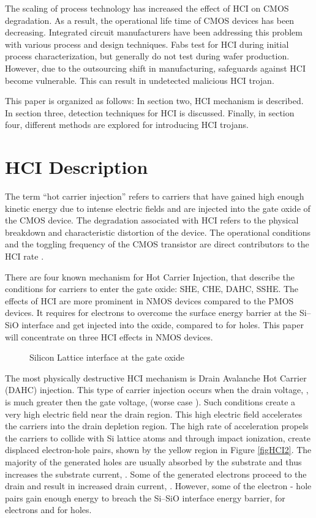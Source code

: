 \documentclass[12pt,conference]{IEEEtran}
\begin{document}
The scaling of process technology has increased the effect of HCI on CMOS degradation.
As a result, the operational life time of CMOS devices has been 
decreasing.
Integrated circuit manufacturers have been addressing this problem
with various process and design techniques.
Fabs test for HCI during initial process characterization, but
generally do not test during wafer production.
However, due to the outsourcing shift in
manufacturing, safeguards against HCI become vulnerable.  This can 
result in undetected malicious HCI trojan.  

This paper is organized as follows:
In section two, HCI mechanism is described.
In section three, detection techniques for HCI is discussed.
Finally, in section four, different methods are explored for introducing HCI trojans.


\section*{HCI Description}

The term ``hot carrier injection'' refers to carriers
that have gained high enough kinetic energy due to intense electric
fields and are injected into the gate oxide of the CMOS device.
The degradation associated with HCI refers to the
physical breakdown and characteristic distortion of the device.
The operational conditions and the toggling frequency of
the CMOS transistor are direct contributors to the HCI rate \cite{HCI96A}.

There are four known mechanism for Hot Carrier Injection,
that describe the conditions for carriers to enter the gate oxide: SHE, CHE, DAHC, SSHE. 
The effects of HCI are more prominent in NMOS devices compared
to the PMOS devices.  It requires  for electrons to
overcome the surface energy barrier at the Si--SiO interface
and get injected into the oxide, compared to  for holes.
This paper will concentrate on three HCI effects in NMOS devices. 
\begin{figure}[htp]
\caption{Silicon Lattice interface at the gate oxide}
\label{figHCI1}
\end{figure}


The most physically destructive HCI mechanism is Drain Avalanche
Hot Carrier (DAHC) injection.
This type of carrier injection occurs when the drain voltage,
, is much greater then the gate voltage,  (worse case  ).
Such conditions create a very high electric field near the drain region.
This high electric field accelerates the carriers
into the drain depletion region.
The high rate of acceleration propels the carriers to collide
with Si lattice atoms and through impact ionization,
create displaced electron-hole pairs, shown by the yellow
region in Figure \ref{figHCI2}.
The majority of the generated holes are usually absorbed by the
substrate and thus increases the substrate current, .
Some of the generated electrons proceed to the drain and result in increased drain
current, .  However, some of the electron - hole pairs
gain enough energy to breach the Si--SiO interface energy
barrier,  for electrons and  for holes.  
\end{document}

